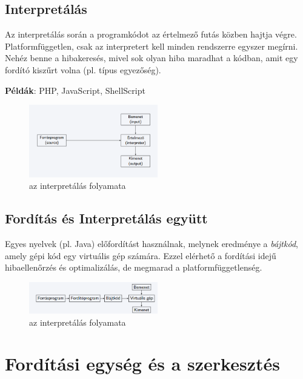 \documentclass[margin=0px]{article}
\begin{document}
	
\subsection{Interpretálás}
	
	Az interpretálás során a programkódot az értelmező futás közben hajtja végre. Platformfüggetlen, csak az interpretert kell minden rendszerre egyszer megírni. Nehéz benne a hibakeresés, mivel sok olyan hiba maradhat a kódban, amit egy fordító kiszűrt volna (pl. típus egyezőség).
	
	\textbf{Példák}: PHP, JavaScript, ShellScript
	

	\begin{figure}[H]
		\centering
		\includegraphics[width=0.5\textwidth]{img/interpretalas_folyamatabra.png}
		\caption{az interpretálás folyamata}
		\label{fig:interpretalas_folyamatabra}
	\end{figure}
	
	
\subsection{Fordítás és Interpretálás együtt}
		
	Egyes nyelvek (pl. Java) előfordítást használnak, melynek eredménye a \textit{bájtkód}, amely gépi kód egy virtuális gép számára. Ezzel elérhető a fordítási idejű hibaellenőrzés és optimalizálás, de megmarad a platformfüggetlenség.
	
	\begin{figure}[H]
		\centering
		\includegraphics[width=0.5\textwidth]{img/bajtkod_folyamatabra.png}
		\caption{az interpretálás folyamata}
		\label{fig:bajtkod_folyamatabra}
	\end{figure}
	
\section{Fordítási egység és a szerkesztés}
	
\end{document}
